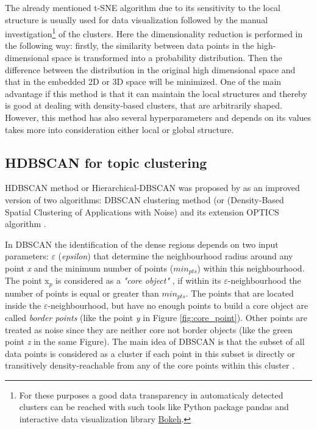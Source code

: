 \documentclass[fontsize=12pt,a4paper,twoside,openany]{scrbook}
\begin{document}
The already mentioned t-SNE algorithm due to its sensitivity to the local structure is usually used for data visualization followed by the manual investigation\footnote{For these purposes a good data transparency in automaticaly detected clusters can be reached with such tools like  Python package pandas and interactive data visualization library \href{https://bokeh.org/}{Bokeh}.} of the clusters. Here the dimensionality reduction is performed in the following way: firstly, the similarity between data points in the high-dimensional space is transformed into a probability distribution. Then the difference between the distribution in the original high dimensional space and that in the embedded 2D or 3D space will be minimized. One of the main advantage if this method is that it can maintain the local structures and thereby is good at dealing with density-based clusters, that are arbitrarily shaped. However, this method has also several hyperparameters and depends on its values takes more into consideration either local or global structure.

\subsection{HDBSCAN for topic clustering}
\label{sec:HDBSCAN}

HDBSCAN method or Hierarchical-DBSCAN was proposed by \parencite{Campello13, Campello15} as an improved version of two algorithms: DBSCAN clustering method (or (Density-Based Spatial Clustering of Applications with Noise) \parencite{Ester96} and its extension OPTICS algorithm \parencite{Ankerst99}.

In DBSCAN the identification of the dense regions depends on two input parameters:  \(\varepsilon\) (\emph{epsilon}) that determine the neighbourhood radius around any point \emph{x} and the minimum number of points (\(min_{pts}\)) within this neighbourhood. The point x\(_p\) is considered as a \emph{"core object"} \parencite{Campello13}, if within its \(\varepsilon\)-neighbourhood the number of points is equal or greater than \(min_{pts}\). The points that are located inside the \(\varepsilon\)-neighbourhood, but have no enough points to build a core object are called \emph{border points} (like the point \emph{y} in Figure \ref{fig:core_point}). Other points are treated as noise since they are neither core not border objects (like the green point \emph{z} in the same Figure). The main idea of DBSCAN is that the subset of all data points is considered as a cluster if each point in this subset is directly or transitively density-reachable from any of the core points within this cluster \parencite{Ester96}.
\end{document}
